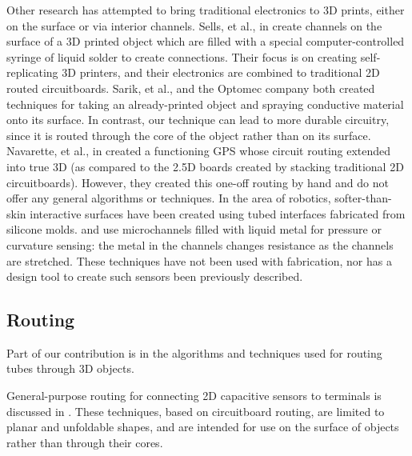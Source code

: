Other research has attempted to bring traditional electronics to 3D prints, either on the surface or via interior channels.  Sells, et al., in \cite{Sells-reprap} create channels on the surface of a 3D printed object which are filled with a special computer-controlled syringe of liquid solder to create connections.  Their focus is on creating self-replicating 3D printers, and their electronics are combined to traditional 2D routed circuitboards.  Sarik, et al., \cite{Sarik-tracebrush}  and the Optomec company \cite{optomec} both created techniques for taking an already-printed object and spraying conductive material onto its surface.  In contrast, our technique can lead to more durable circuitry, since it is routed through the core of the object rather than on its surface.  Navarette, et al., in \cite{Navarrette-gps} created a functioning GPS whose circuit routing extended into true 3D (as compared to the 2.5D boards created by stacking traditional 2D circuitboards).  However, they created this one-off routing by hand and do not offer any general algorithms or techniques.  In the area of robotics, softer-than-skin interactive surfaces have been created using tubed interfaces fabricated from silicone molds.  \cite{Park-microchannels} and \cite{Majidi-curvature} use microchannels filled with liquid metal for pressure or curvature sensing: the metal in the channels changes resistance as the channels are stretched.  These techniques have not been used with fabrication, nor has a design tool to create such sensors been previously described.

\subsection{Routing}

Part of our contribution is in the algorithms and techniques used for routing tubes through 3D objects.

General-purpose routing for connecting 2D capacitive sensors to terminals is discussed in \cite{Savage-midas}.  These techniques, based on circuitboard routing, are limited to planar and unfoldable shapes, and are intended for use on the surface of objects rather than through their cores.

